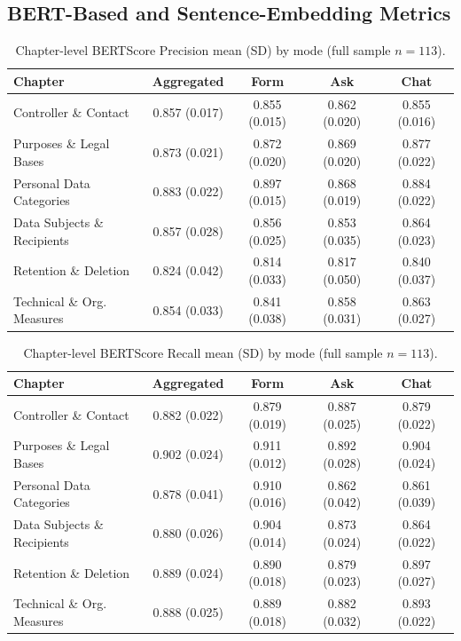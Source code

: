 \subsection{BERT-Based and Sentence-Embedding Metrics}
\label{app:items-chapter-nlp-bert}

\begin{table}[htbp]
\centering
\caption{Chapter-level BERTScore Precision mean (SD) by mode (full
sample $n = 113$).}
\label{tab:nlp-chapter-bertp}
\small
\begin{tabular}{@{}l c c c c@{}}
\toprule
Chapter & Aggregated & Form & Ask & Chat \\
\midrule
Controller \& Contact         & 0.857 (0.017) & 0.855 (0.015) & 0.862 (0.020) & 0.855 (0.016) \\
Purposes \& Legal Bases       & 0.873 (0.021) & 0.872 (0.020) & 0.869 (0.020) & 0.877 (0.022) \\
Personal Data Categories      & 0.883 (0.022) & 0.897 (0.015) & 0.868 (0.019) & 0.884 (0.022) \\
Data Subjects \& Recipients   & 0.857 (0.028) & 0.856 (0.025) & 0.853 (0.035) & 0.864 (0.023) \\
Retention \& Deletion         & 0.824 (0.042) & 0.814 (0.033) & 0.817 (0.050) & 0.840 (0.037) \\
Technical \& Org. Measures    & 0.854 (0.033) & 0.841 (0.038) & 0.858 (0.031) & 0.863 (0.027) \\
\bottomrule
\end{tabular}
\end{table}

\begin{table}[htbp]
\centering
\caption{Chapter-level BERTScore Recall mean (SD) by mode (full
sample $n = 113$).}
\label{tab:nlp-chapter-bertr}
\small
\begin{tabular}{@{}l c c c c@{}}
\toprule
Chapter & Aggregated & Form & Ask & Chat \\
\midrule
Controller \& Contact         & 0.882 (0.022) & 0.879 (0.019) & 0.887 (0.025) & 0.879 (0.022) \\
Purposes \& Legal Bases       & 0.902 (0.024) & 0.911 (0.012) & 0.892 (0.028) & 0.904 (0.024) \\
Personal Data Categories      & 0.878 (0.041) & 0.910 (0.016) & 0.862 (0.042) & 0.861 (0.039) \\
Data Subjects \& Recipients   & 0.880 (0.026) & 0.904 (0.014) & 0.873 (0.024) & 0.864 (0.022) \\
Retention \& Deletion         & 0.889 (0.024) & 0.890 (0.018) & 0.879 (0.023) & 0.897 (0.027) \\
Technical \& Org. Measures    & 0.888 (0.025) & 0.889 (0.018) & 0.882 (0.032) & 0.893 (0.022) \\
\bottomrule
\end{tabular}
\end{table}

